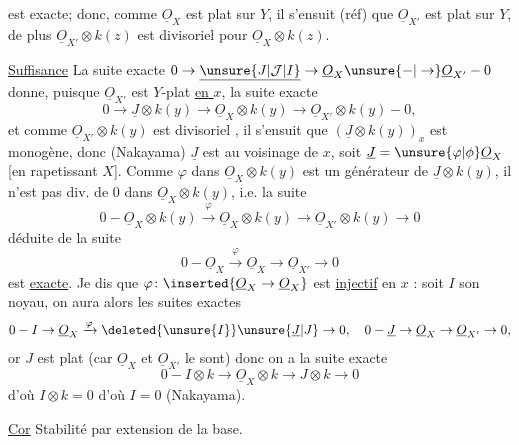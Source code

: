 est exacte; donc, comme $\underline{O}_X$ est plat sur $Y$, il s'ensuit (réf) que $\underline{O}_{X'}$ est plat sur $Y$, de plus $\underline{O}_{X'}\otimes k(z)$ est  divisoriel pour $\underline{O}_X\otimes k(z)$. 

\uline{Suffisance} La suite exacte $0\to\underline{\unsure{J|\mathcal{J}|I}}\to\underline{O}_X\unsure{-|\to}\underline{O}_{X'}-0$ donne, puisque $\underline{O}_{X'}$ est $Y$-plat \uline{en $x$}, la suite exacte
\[
0\to\underline{J}\otimes k(y)\to\underline{O}_X\otimes k(y)\to\underline{O}_{X'}\otimes k(y)-0,
\]
et comme $\underline{O}_{X'}\otimes k(y)$ est divisoriel , il s'ensuit que $(\underline{J}\otimes k(y))_x$ est monogène, donc (Nakayama) $\underline{J}$  est   au voisinage de $x$, soit $\underline{J}=\unsure{\varphi|\phi}\underline{O}_X$ [en rapetissant $X$]. Comme $\varphi$ dans $\underline{O}_X\otimes k(y)$ est un générateur de $\underline{J}\otimes k(y)$, il n'est pas div. de $0$ dans $\underline{O}_X\otimes k(y)$, i.e. la suite
\[
0-\underline{O}_X\otimes k(y)\xrightarrow{\varphi}\underline{O}_X\otimes k(y)\to\underline{O}_{X'}\otimes k(y)\to0
\]
déduite de la suite
\[
0-\underline{O}_X\xrightarrow{\varphi}\underline{O}_X\to\underline{O}_{X'}\to0
\]
est \uline{exacte}. Je dis que $\varphi\colon\inserted{\underline{O}_X\to\underline{O}_X}$ est \uline{injectif} en $x$ : soit $I$ son noyau, on aura alors les suites exactes
\[
0-I\to\underline{O}_X\xrightarrow{\varphi}\deleted{\unsure{I}}\unsure{\underline{J}|J}\to0,\quad 0-\underline{J}\to\underline{O}_X\to\underline{O}_{X'}\to0,
\]
or $J$ est plat (car $\underline{O}_X$ et $\underline{O}_{X'}$ le sont) donc on a la suite exacte
\[
0-I\otimes k\to\underline{O}_X\otimes k\to J\otimes k\to0
\]
d'où $I\otimes k=0$ d'où $I=0$ (Nakayama). 

\uline{Cor} Stabilité par extension de la base.
